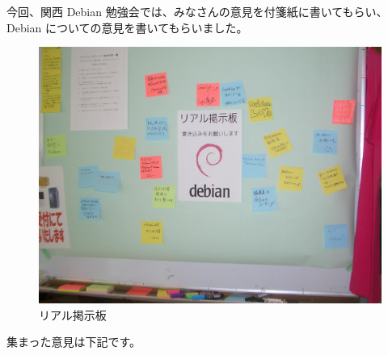 \documentclass[mingoth,a4paper]{jsarticle}
\begin{document}
今回、関西 Debian 勉強会では、みなさんの意見を付箋紙に書いてもらい、
Debian についての意見を書いてもらいました。

\begin{figure}[H]
\begin{center}
  \includegraphics[width=\hsize]{image200708/real-keijiban.jpg}
\end{center}
\caption{リアル掲示板}
\label{fig:realkeiji}
\end{figure}

集まった意見は下記です。
\end{document}
